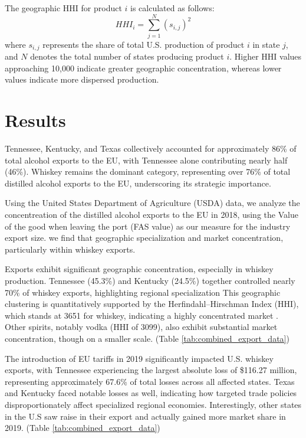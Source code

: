 \documentclass[AEJ]{AEA}
\begin{document}
	The geographic HHI for product \( i \) is calculated as follows:
	\[
	HHI_i = \sum_{j=1}^{N}(s_{i,j})^2
	\]
	where \( s_{i,j} \) represents the share of total U.S. production of product \( i \) in state \( j \), and \( N \) denotes the total number of states producing product \( i \). Higher HHI values approaching 10,000 indicate greater geographic concentration, whereas lower values indicate more dispersed production.
	
	\section{Results}
        	

        Tennessee, Kentucky, and Texas collectively accounted for approximately 86\% of total alcohol exports to the EU, with Tennessee alone contributing nearly half (46\%). Whiskey remains the dominant category, representing over 76\% of total distilled alcohol exports to the EU, underscoring its strategic importance.

		Using the United States Department of Agriculture (USDA) data, we analyze the concentreation of the distilled alcohol exports to the EU in 2018, using the Value of the good when leaving the port (FAS value) as our measure for the industry export size. we find that geographic specialization and market concentration, particularly within whiskey exports.


Exports exhibit significant geographic concentration, especially in whiskey production. Tennessee (45.3\%) and Kentucky (24.5\%) together controlled nearly 70\% of whiskey exports, highlighting regional specialization 
This geographic clustering is quantitatively supported by the Herfindahl–Hirschman Index (HHI), which stands at 3651 for whiskey, indicating a highly concentrated market . Other spirits, notably vodka (HHI of 3099), also exhibit substantial market concentration, though on a smaller scale.  (Table \ref{tab:combined_export_data})

The introduction of EU tariffs in 2019 significantly impacted U.S. whiskey exports, with Tennessee experiencing the largest absolute loss of \$116.27 million, representing approximately 67.6\% of total losses across all affected states. Texas and Kentucky faced notable losses as well, indicating how targeted trade policies disproportionately affect specialized regional economies. Interestingly, other states in the U.S saw raise in their export and actually gained more market share in 2019.
(Table \ref{tab:combined_export_data})
\end{document}

